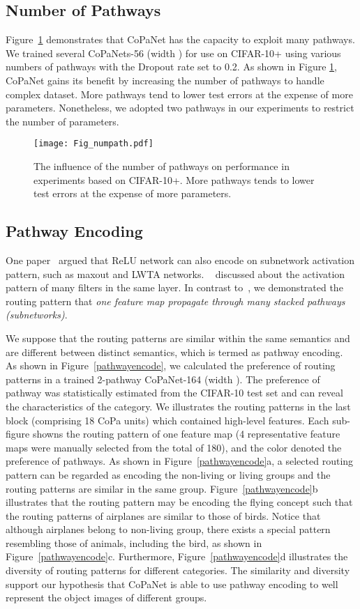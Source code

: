 \documentclass[wcp]{jmlr}
\begin{document}
\subsection{Number of Pathways}
Figure~\ref{pathway} demonstrates that CoPaNet has the capacity to exploit many pathways. 
We trained several CoPaNets-56 (width ) for use on CIFAR-10+ using various numbers of pathways with the Dropout rate set to 0.2. 
As shown in Figure \ref{pathway}, CoPaNet gains its benefit by increasing the number of pathways to handle complex dataset.
More pathways tend to lower test errors at the expense of more parameters.
Nonetheless, we adopted two pathways in our experiments to restrict the number of parameters.

\begin{figure}
\centering
\texttt{[image: Fig\_numpath.pdf]}
\caption{The influence of the number of pathways on performance in experiments based on CIFAR-10+. More pathways tends to lower test errors at the expense of more parameters.}
\label{pathway}
\end{figure}

\subsection{Pathway Encoding}
One paper~\citep{srivastava2014understanding} argued that ReLU network can also encode on subnetwork activation pattern, such as maxout and LWTA networks.
~\cite{srivastava2014understanding} discussed about the activation pattern of many filters in the same layer.
In contrast to~\cite{srivastava2014understanding}, we demonstrated the routing pattern that \textit{one feature map propagate through many stacked pathways (subnetworks)}.

We suppose that the routing patterns are similar within the same semantics and are different between distinct semantics, which is termed as pathway encoding.
As shown in Figure~\ref{pathwayencode}, we calculated the preference of routing patterns in a trained 2-pathway CoPaNet-164 (width ). 
The preference of pathway was statistically estimated from the CIFAR-10 test set and can reveal the characteristics of the category.
We illustrates the routing patterns in the last block (comprising 18 CoPa units) which contained high-level features.
Each sub-figure showns the routing pattern of one feature map (4 representative feature maps were manually selected from the total of 180), and the color denoted the preference of pathways.
As shown in Figure~\ref{pathwayencode}a, a selected routing pattern can be regarded as encoding the non-living or living groups and the routing patterns are similar in the same group. 
Figure~\ref{pathwayencode}b illustrates that the routing pattern may be encoding the flying concept such that the routing patterns of airplanes are similar to those of birds.
Notice that although airplanes belong to non-living group, there exists a special pattern resembling those of animals, including the bird, as shown in Figure~\ref{pathwayencode}c. 
Furthermore, Figure~\ref{pathwayencode}d illustrates the diversity of routing patterns for different categories.
The similarity and diversity support our hypothesis that CoPaNet is able to use pathway encoding to well represent the object images of different groups. 
\end{document}

